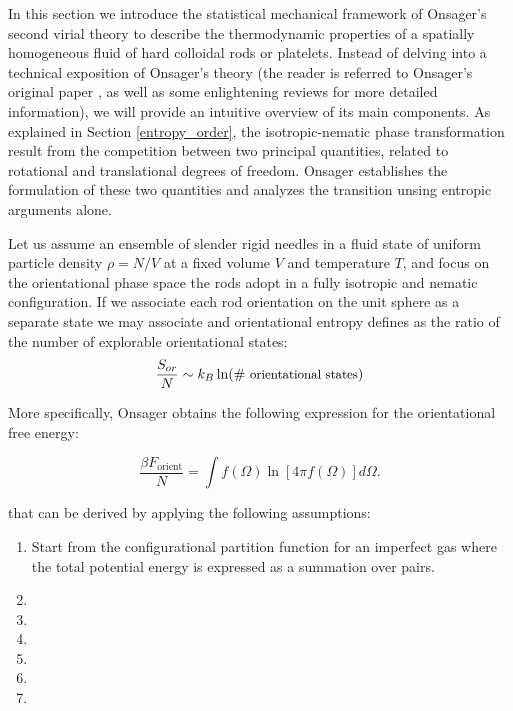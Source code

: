 In this section we introduce the statistical mechanical framework of  Onsager's second virial theory \cite{onsager1949} to describe the thermodynamic properties of a spatially homogeneous fluid of hard colloidal rods or platelets. Instead of delving into a technical exposition of Onsager's theory (the reader is referred to Onsager's original paper \cite{onsager}, as well as some enlightening reviews \cite{vroege92, allenevans} for more detailed information), we will provide an intuitive overview of its main components. As explained in Section \ref{entropy_order}, the isotropic-nematic phase transformation result from the competition between two principal quantities, related to rotational and translational degrees of freedom. Onsager establishes the formulation of these two quantities and analyzes the transition unsing entropic arguments alone.

Let us assume an ensemble of slender rigid needles in a fluid state of uniform particle density $\rho = N/V$ at a fixed volume $V$ and temperature $T$, and focus on the orientational phase space the rods adopt in a fully isotropic and nematic configuration. If we associate each rod orientation on the unit sphere as a separate state we may associate and orientational entropy defines as the ratio of the number of explorable orientational states:
\begin{equation}
\frac{S_{or}}{N} \sim k_{B} \ln ( \mbox{\# {\small orientational states}})
\label{sor}
\end{equation}

More specifically, Onsager obtains the following expression for the orientational free energy:

\begin{equation}
\frac{\beta F_{\text{orient}}}{N}=\int f(\Omega)\ln \left[4\pi f(\Omega)\right]d\Omega.
\label{0forient}
\end{equation}

that can be derived by applying the following assumptions:


\vspace{0.3cm}
\begin{enumerate}
\setlength\itemsep{1em}
\item Start from the configurational partition function for an imperfect gas where the total potential energy is expressed as a summation over pairs.
\item 
\item
\item
\item
\item
\item
\end{enumerate}
\vspace{0.3cm}





